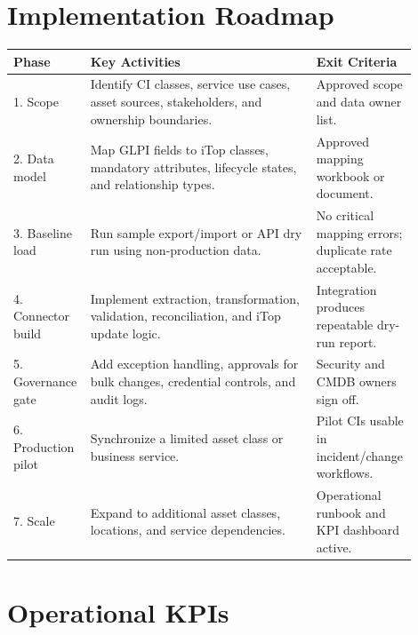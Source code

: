 \documentclass[11pt]{article}
\begin{document}
\section{Implementation Roadmap}

\begin{longtable}{p{0.17\linewidth}p{0.55\linewidth}p{0.18\linewidth}}
\toprule
\rowcolor{LightBlue}\textbf{Phase} & \textbf{Key Activities} & \textbf{Exit Criteria} \\
\midrule
1. Scope & Identify CI classes, service use cases, asset sources, stakeholders, and ownership boundaries. & Approved scope and data owner list. \\
2. Data model & Map GLPI fields to iTop classes, mandatory attributes, lifecycle states, and relationship types. & Approved mapping workbook or document. \\
3. Baseline load & Run sample export/import or API dry run using non-production data. & No critical mapping errors; duplicate rate acceptable. \\
4. Connector build & Implement extraction, transformation, validation, reconciliation, and iTop update logic. & Integration produces repeatable dry-run report. \\
5. Governance gate & Add exception handling, approvals for bulk changes, credential controls, and audit logs. & Security and CMDB owners sign off. \\
6. Production pilot & Synchronize a limited asset class or business service. & Pilot CIs usable in incident/change workflows. \\
7. Scale & Expand to additional asset classes, locations, and service dependencies. & Operational runbook and KPI dashboard active. \\
\bottomrule
\end{longtable}

\section{Operational KPIs}
\end{document}
